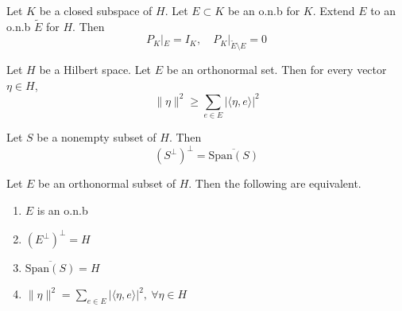 \begin{proposition}
  Let $K$ be a closed subspace of $H$. Let $E \subset K$ be an o.n.b
  for $K$. Extend $E$ to an o.n.b $\tilde{E}$ for $H$. Then \[
    P_K|_E = I_K, \quad P_K|_{\tilde{E} \setminus E} = 0
  \]
\end{proposition}

\begin{remark}
  Let $H$ be a Hilbert space. Let $E$ be an orthonormal set. Then for
  every vector $\eta \in H$, \[
    \|\eta\|^2 \ge \sum_{e \in E} |\langle \eta ,  e \rangle |^2
  \]
\end{remark}

\begin{lemma}
  Let $S$ be a nonempty subset of $H$. Then \[
    (S^\perp)^\perp  = \overline{\textrm{Span}(S)}
  \]
\end{lemma}

\begin{corollary}
  Let $E$ be an orthonormal subset of $H$. Then the following are equivalent.
  \begin{enumerate}[label=(\arabic*)]
    \item $E$ is an o.n.b
    \item $(E^\perp)^\perp = H$
    \item $\overline{\textrm{Span}(S)} = H$
    \item $\|\eta\|^2 = \sum_{e \in E} |\langle \eta ,  e \rangle
      |^2, \ \forall \eta \in H$
  \end{enumerate}
\end{corollary}


